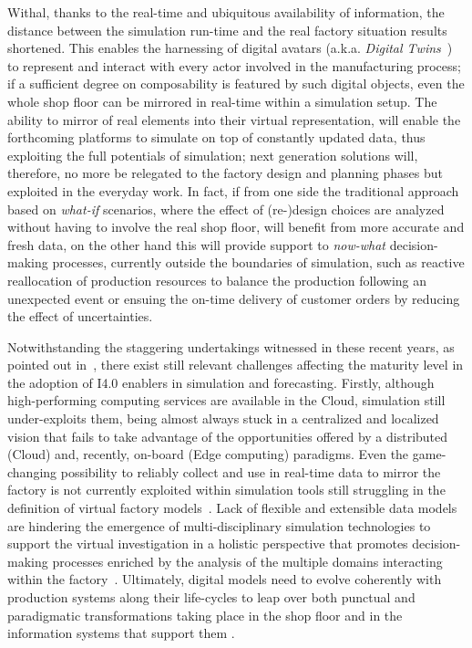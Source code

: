 Withal, thanks to the real-time and ubiquitous availability of information, the distance between the simulation run-time and the real factory situation results shortened. 
This enables the harnessing of digital avatars (a.k.a. \textit{Digital Twins}~\cite{Uhlemann2017}) to represent and interact with every actor involved in the manufacturing process; if a sufficient degree on composability is featured by such digital objects, even the whole shop floor can be mirrored in real-time within a simulation setup.   
The ability to mirror of real elements into their virtual representation, will enable the forthcoming platforms to simulate on top of constantly updated data, thus exploiting the full potentials of simulation; next generation solutions will, therefore, no more be relegated to the factory design and planning phases but exploited in the everyday work. In fact, if from one side the traditional approach based on \textit{what-if} scenarios, where the effect of (re-)design choices are analyzed without having to involve the real shop floor, will benefit from more accurate and fresh data, on the other hand this will provide support to \textit{now-what} decision-making processes, currently outside the boundaries of simulation, such as reactive reallocation of production resources to balance the production following an unexpected event or ensuing the on-time delivery of customer orders by reducing the effect of uncertainties.


Notwithstanding the staggering undertakings witnessed in these recent years, as pointed out in~\cite{pedrazzoli2014simulation}, there exist still relevant challenges affecting the maturity level in the adoption of I4.0 enablers in simulation and forecasting. 
Firstly, although high-performing computing services are available in the Cloud, simulation still under-exploits them, being almost always stuck in a centralized and localized vision that fails to take advantage of the opportunities offered by a distributed (Cloud) and, recently, on-board (Edge computing) paradigms.
Even the game-changing possibility to reliably collect and use in real-time data to mirror the factory is not currently exploited within simulation tools still struggling in the definition of virtual factory models~\cite{ciavotta2017microservice}.
Lack of flexible and extensible data models are hindering the emergence of multi-disciplinary simulation technologies to support the virtual investigation in a holistic perspective that promotes decision-making processes enriched by the analysis of the multiple domains interacting within the factory~\cite{hehenberger2016design}.
Ultimately, digital models need to evolve coherently with production systems along their life-cycles to leap over both punctual and paradigmatic transformations taking place in the shop floor and in the  information systems that support them \cite{azab2012simulation}.


